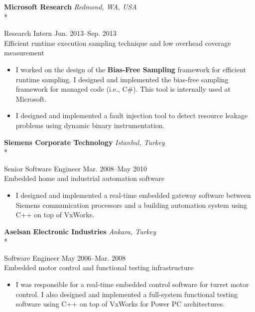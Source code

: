 \documentclass[10pt]{article}
\newcommand{\mysub}[3]{\textbf{#1} {#2} \hfill {\em #3}}
\newcommand{\myssub}[1]{%
  \par\begingroup
    \leftskip=2mm\relax
    \noindent #1\par
  \endgroup
  \vspace{1mm}%
}
\newenvironment{keepblock}{\par\Needspace{4\baselineskip}\noindent}{\par}
\begin{document}
\begin{keepblock}
\mysub{Microsoft Research}{}{Redmond, WA, USA} \\*
\myssub{\vspace{1mm}Research Intern \hfill Jun. 2013--Sep. 2013\\
Efficient runtime execution sampling technique and low overhead coverage measurement
\vspace{-1mm}
\begin{itemize}
\setlength\itemsep{0em}
\item{I worked on the design of the \textbf{Bias-Free Sampling} framework for efficient runtime sampling. I designed and implemented the bias-free sampling framework for managed code (i.e., C\#). This tool is internally used at Microsoft.}
\item{I designed and implemented a fault injection tool to detect resource leakage problems using dynamic binary instrumentation. }
\end{itemize}
\vspace{-2mm}
}
\end{keepblock}

\begin{keepblock}
\mysub{Siemens Corporate Technology}{}{Istanbul, Turkey} \\*
\myssub{\vspace{1mm}Senior Software Engineer \hfill Mar. 2008--May 2010 \\
Embedded home and industrial automation software
\vspace{-1mm}
\begin{itemize}
\setlength\itemsep{0em}
\item{I designed and implemented a real-time embedded gateway software between Siemens communication processors and a building automation system using C++ on top of VxWorks.}
\end{itemize}
}
\end{keepblock}


\begin{keepblock}
\mysub{Aselsan Electronic Industries}{}{Ankara, Turkey} \\*
\myssub{\vspace{1mm}Software Engineer \hfill May 2006--Mar. 2008 \\
Embedded motor control and functional testing infrastructure
\vspace{-1mm}
\begin{itemize}
\setlength\itemsep{0em}
\item{I was responsible for a real-time embedded control software for turret motor control. I also designed and implemented a full-system functional testing software using C++ on top of VxWorks for Power PC architectures.}
\end{itemize}
}
\end{keepblock}
\end{document}
